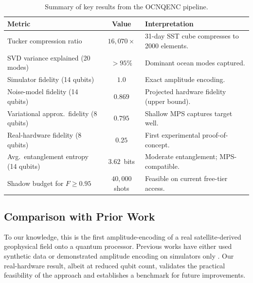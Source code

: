 \documentclass[12pt,a4paper]{article}
\begin{document}
\begin{table}[H]
  \centering
  \caption{Summary of key results from the OCNQENC pipeline.}
  \label{tab:results}
  \begin{tabular}{@{}p{5.2cm}cp{5.8cm}@{}}
    \toprule
    \textbf{Metric} & \textbf{Value} & \textbf{Interpretation} \\
    \midrule
    Tucker compression ratio & $16{,}070\times$ & 31-day SST cube compresses to 2000 elements. \\
    SVD variance explained (20 modes) & $>95\%$ & Dominant ocean modes captured. \\
    Simulator fidelity (14 qubits) & $1.0$ & Exact amplitude encoding. \\
    Noise-model fidelity (14 qubits) & $0.869$ & Projected hardware fidelity (upper bound). \\
    Variational approx.\ fidelity (8 qubits) & $0.795$ & Shallow MPS captures target well. \\
    Real-hardware fidelity (8 qubits) & $0.25$ & First experimental proof-of-concept. \\
    Avg.\ entanglement entropy (14 qubits) & $3.62$~bits & Moderate entanglement; MPS-compatible. \\
    Shadow budget for $F\geq0.95$ & $40{,}000$ shots & Feasible on current free-tier access. \\
    \bottomrule
  \end{tabular}
\end{table}

\subsection{Comparison with Prior Work}
To our knowledge, this is the first amplitude-encoding of a real satellite-derived geophysical field onto a quantum processor. Previous works have either used synthetic data \cite{schuld2020} or demonstrated amplitude encoding on simulators only \cite{lubasch2021}. Our real-hardware result, albeit at reduced qubit count, validates the practical feasibility of the approach and establishes a benchmark for future improvements.
\end{document}
